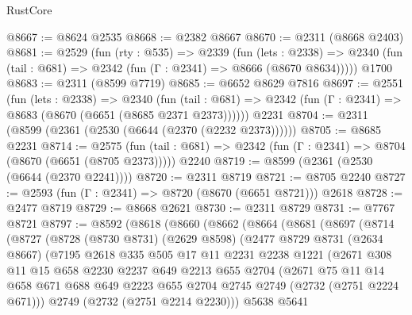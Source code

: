 \begin{lexlean}{RustCore}
\begin{coremodule}
@8667 := @8624 @2535
@8668 := @2382 @8667
@8670 := @2311 (@8668 @2403)
@8681 := @2529
    (fun (rty : @535) =>
    @2339
      (fun (lets : @2338) =>
      @2340 (fun (tail : @681) => @2342 (fun (Γ : @2341) => @8666 (@8670 @8634)))))
    @1700
@8683 := @2311 (@8599 @7719)
@8685 := @6652 @8629 @7816
@8697 := @2551
    (fun (lets : @2338) =>
    @2340
      (fun (tail : @681) => @2342 (fun (Γ : @2341) => @8683 (@8670 (@6651 (@8685 @2371 @2373))))))
    @2231
@8704 := @2311 (@8599 (@2361 (@2530 (@6644 (@2370 (@2232 @2373))))))
@8705 := @8685 @2231
@8714 := @2575
    (fun (tail : @681) => @2342 (fun (Γ : @2341) => @8704 (@8670 (@6651 (@8705 @2373)))))
    @2240
@8719 := @8599 (@2361 (@2530 (@6644 (@2370 @2241))))
@8720 := @2311 @8719
@8721 := @8705 @2240
@8727 := @2593 (fun (Γ : @2341) => @8720 (@8670 (@6651 @8721))) @2618
@8728 := @2477 @8719
@8729 := @8668 @2621
@8730 := @2311 @8729
@8731 := @7767 @8721
@8797 := @8592
    (@8618
      (@8660
        (@8662
          (@8664
            (@8681
              (@8697
                (@8714
                  (@8727
                    (@8728
                      (@8730 @8731)
                      (@2629 @8598)
                      (@2477
                        @8729
                        @8731
                        (@2634 @8667)
                        (@7195
                          @2618
                          @335
                          @505
                          @17
                          @11
                          @2231
                          @2238
                          @1221
                          (@2671
                            @308
                            @11
                            @15
                            @658
                            @2230
                            @2237
                            @649
                            @2213
                            @655
                            @2704
                            (@2671
                              @75
                              @11
                              @14
                              @658
                              @671
                              @688
                              @649
                              @2223
                              @655
                              @2704
                              @2745
                              @2749
                              (@2732 (@2751 @2224 @671)))
                            @2749
                            (@2732 (@2751 @2214 @2230)))
                          @5638
                          @5641

\end{coremodule}
\end{lexlean}
